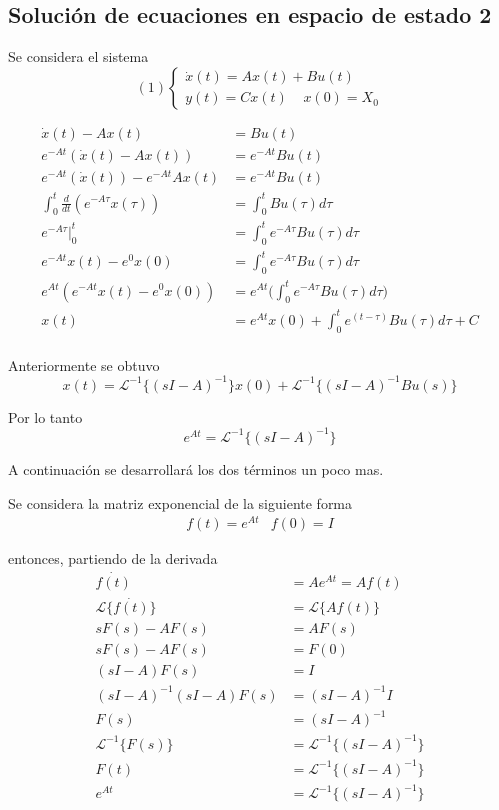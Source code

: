 \subsection{Solución de ecuaciones en espacio de estado 2}

Se considera el sistema
\[(1)
    \left\{
        \begin{array}{lll}
            \dot{x}(t) = Ax(t) + Bu(t) \\
            y(t) = Cx(t) \;\;\;\; x(0)=X_{0}
        \end{array}
    \right.
\]

\[
    \begin{split}
        \dot{x}(t) - Ax(t) & = Bu(t)\\
        e^{-At} (\dot{x}(t) - Ax(t)) & = e^{-At}Bu(t) \\
        e^{-At} (\dot{x}(t)) - e^{-At}Ax(t) & = e^{-At}Bu(t) \\
        \int_{0}^{t} \frac{d}{dt} ( e^{-A\tau}x(\tau) ) & = \int_{0}^{t} Bu(\tau)d\tau \\
        e^{ -A\tau } \Big|_{0}^{t} & = \int_{0}^{t} e^{-A\tau} Bu(\tau)d\tau \\
        e^{-At}x(t) - e^{0}x(0) & = \int_{0}^{t} e^{-A\tau} Bu(\tau) d\tau \\
        e^{At} (e^{-At}x(t) - e^{0}x(0)) & = e^{At} \Big(\int_{0}^{t} e^{-A\tau} Bu(\tau)d\tau\Big) \\
        x(t) & = e^{At}x(0) + \int_{0}^{t} e^{(t-\tau)}Bu(\tau) d\tau + C \\
    \end{split}
\]

Anteriormente se obtuvo
\[
    x(t) = \mathcal{L}^{-1} \{ (sI-A)^{-1} \} x(0) + \mathcal{L}^{-1} \{ (sI-A)^{-1}Bu(s) \}
\]

Por lo tanto
\[
    e^{At} = \mathcal{L}^{-1} \{ (sI-A)^{-1} \}
\]

A continuación se desarrollará los dos términos un poco mas.

Se considera la matriz exponencial de la siguiente forma 
\[
    \begin{matrix}
        f(t) = e^{At} & f(0) = I
    \end{matrix}
\]

entonces, partiendo de la derivada 
\[
    \begin{split}
        \dot{f(t)} & = Ae^{At} = Af(t) \\
        \mathcal{L} \{ \dot{f(t)} \} & = \mathcal{L} \{ Af(t) \} \\
        sF(s)-AF(s) & = AF(s) \\
        sF(s)-AF(s) & = F(0) \\
        (sI-A)F(s) & = I \\
        (sI-A)^{-1} (sI-A)F(s) & = (sI-A)^{-1}I \\
        F(s) & = (sI-A)^{-1} \\
        \mathcal{L}^{-1} \{ F(s) \} & = \mathcal{L}^{-1} \{ (sI-A)^{-1} \} \\
        F(t) & = \mathcal{L}^{-1} \{ (sI-A)^{-1} \} \\
        e^{At} & = \mathcal{L}^{-1} \{ (sI-A)^{-1} \}
    \end{split}
\]

